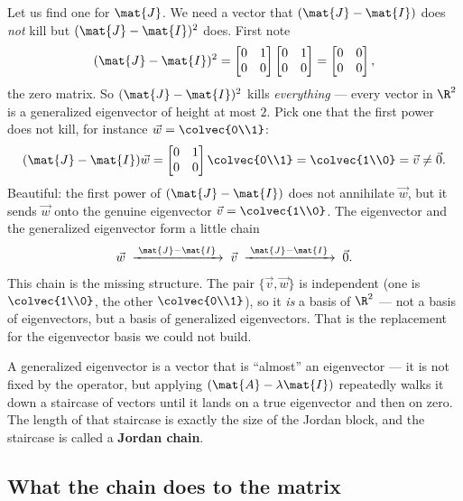 Let us find one for $\mat{J}$. We need a vector that $(\mat{J}-\mat{I})$ does \emph{not}
kill but $(\mat{J}-\mat{I})^2$ does. First note
\[
(\mat{J}-\mat{I})^2=\begin{bmatrix}0&1\\0&0\end{bmatrix}\begin{bmatrix}0&1\\0&0\end{bmatrix}
=\begin{bmatrix}0&0\\0&0\end{bmatrix},
\]
the zero matrix. So $(\mat{J}-\mat{I})^2$ kills \emph{everything} --- every vector in
$\R^2$ is a generalized eigenvector of height at most $2$. Pick one that the first power
does not kill, for instance $\vec{w}=\colvec{0\\1}$:
\[
(\mat{J}-\mat{I})\vec{w}=\begin{bmatrix}0&1\\0&0\end{bmatrix}\colvec{0\\1}=\colvec{1\\0}=\vec{v}\neq\vec{0}.
\]
Beautiful: the first power of $(\mat{J}-\mat{I})$ does not annihilate $\vec{w}$, but it
sends $\vec{w}$ onto the genuine eigenvector $\vec{v}=\colvec{1\\0}$. The eigenvector and
the generalized eigenvector form a little chain
\[
\vec{w}\;\xrightarrow{\;\mat{J}-\mat{I}\;}\;\vec{v}\;\xrightarrow{\;\mat{J}-\mat{I}\;}\;\vec{0}.
\]
This chain is the missing structure. The pair $\{\vec{v},\vec{w}\}$ is independent (one
is $\colvec{1\\0}$, the other $\colvec{0\\1}$), so it \emph{is} a basis of $\R^2$ --- not
a basis of eigenvectors, but a basis of generalized eigenvectors. That is the
replacement for the eigenvector basis we could not build.

\begin{intuitionbox}
A generalized eigenvector is a vector that is ``almost'' an eigenvector --- it is not
fixed by the operator, but applying $(\mat{A}-\lambda\mat{I})$ repeatedly walks it down a
staircase of vectors until it lands on a true eigenvector and then on zero. The length
of that staircase is exactly the size of the Jordan block, and the staircase is called a
\textbf{Jordan chain}.
\end{intuitionbox}

\subsection{What the chain does to the matrix}

